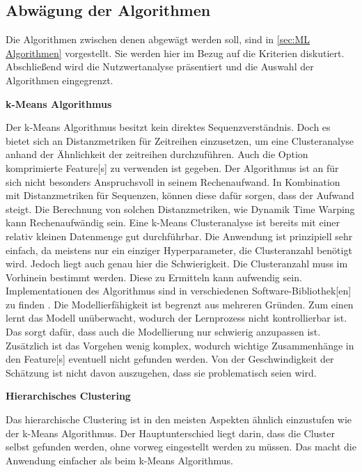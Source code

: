 \subsection{Abwägung der Algorithmen}
Die Algorithmen zwischen denen abgewägt werden soll, sind in \ref{sec:ML Algorithmen} vorgestellt. Sie werden hier im Bezug auf die Kriterien diskutiert. Abschließend wird die Nutzwertanalyse präsentiert und die Auswahl der Algorithmen eingegrenzt. \dubpar

\textbf{k-Means Algorithmus}\par
Der k-Means Algorithmus besitzt kein direktes Sequenzverständnis. Doch es bietet sich an Distanzmetriken für Zeitreihen einzusetzen, um eine Clusteranalyse anhand der Ähnlichkeit der zeitreihen durchzuführen. Auch die Option komprimierte \gls{Feature}[s] zu verwenden ist gegeben. Der Algorithmus ist an für sich nicht besonders Anspruchsvoll in seinem Rechenaufwand. In Kombination mit Distanzmetriken für Sequenzen, können diese dafür sorgen, dass der Aufwand steigt. Die Berechnung von solchen Distanzmetriken, wie Dynamik Time Warping kann Rechenaufwändig sein. Eine k-Means Clusteranalyse ist bereits mit einer relativ kleinen Datenmenge gut durchführbar. Die Anwendung ist prinzipiell sehr einfach, da meistens nur ein einziger \gls{Hyperparameter}, die Clusteranzahl benötigt wird. Jedoch liegt auch genau hier die Schwierigkeit. Die Clusteranzahl muss im Vorhinein bestimmt werden. Diese zu Ermitteln kann aufwendig sein. Implementationen des Algorithmus sind in verschiedenen Software-\gls{Bibliothek}[en] zu finden \cite{FabianPedregosa.2011}. Die Modellierfähigkeit ist begrenzt aus mehreren Gründen. Zum einen lernt das Modell unüberwacht, wodurch der Lernprozess nicht kontrollierbar ist. Das sorgt dafür, dass auch die Modellierung nur schwierig anzupassen ist. Zusätzlich ist das Vorgehen wenig komplex, wodurch wichtige Zusammenhänge in den \gls{Feature}[s] eventuell nicht gefunden werden. Von der Geschwindigkeit der Schätzung ist nicht davon auszugehen, dass sie problematisch seien wird.\dubpar

\textbf{Hierarchisches Clustering}\par
Das hierarchische Clustering ist in den meisten Aspekten ähnlich einzustufen wie der k-Means Algorithmus. Der Hauptunterschied liegt darin, dass die Cluster selbst gefunden werden, ohne vorweg eingestellt werden zu müssen. Das macht die Anwendung einfacher als beim k-Means Algorithmus.\dubpar

